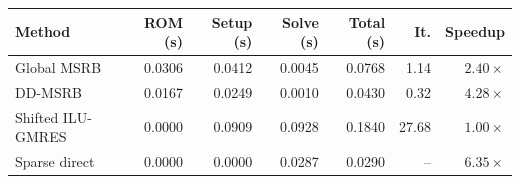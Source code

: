 \begin{tabular}{lrrrrrr}\toprule
Method & ROM (s) & Setup (s) & Solve (s) & Total (s) & It. & Speedup \\
\midrule
Global MSRB & 0.0306 & 0.0412 & 0.0045 & 0.0768 & 1.14 & $ 2.40 \times $ \\
DD-MSRB & 0.0167 & 0.0249 & 0.0010 & 0.0430 & 0.32 & $ 4.28 \times $ \\
Shifted ILU-GMRES & 0.0000 & 0.0909 & 0.0928 & 0.1840 & 27.68 & $ 1.00 \times $ \\
Sparse direct & 0.0000 & 0.0000 & 0.0287 & 0.0290 & -- & $ 6.35 \times $ \\
\bottomrule\end{tabular}
